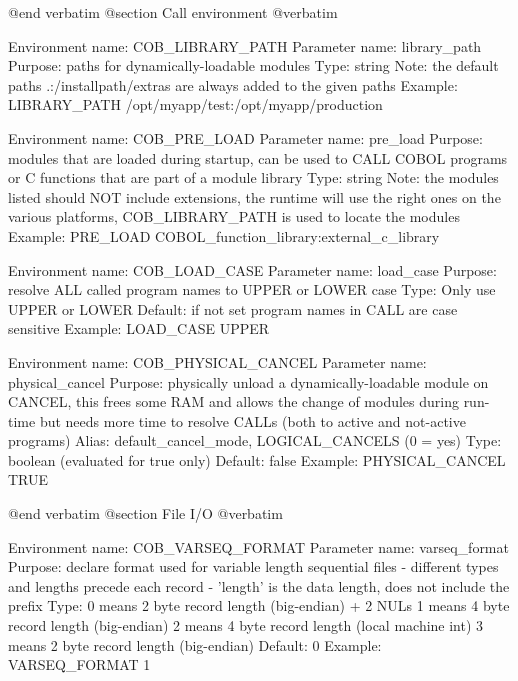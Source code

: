 @end verbatim
@section Call environment
@verbatim


Environment name:  COB_LIBRARY_PATH
  Parameter name:  library_path
         Purpose:  paths for dynamically-loadable modules
            Type:  string
            Note:  the default paths .:/installpath/extras are always
                   added to the given paths
         Example:  LIBRARY_PATH    /opt/myapp/test:/opt/myapp/production

Environment name:  COB_PRE_LOAD
  Parameter name:  pre_load
         Purpose:  modules that are loaded during startup, can be used
                   to CALL COBOL programs or C functions that are part
                   of a module library
            Type:  string
            Note:  the modules listed should NOT include extensions, the
                   runtime will use the right ones on the various platforms,
                   COB_LIBRARY_PATH is used to locate the modules
         Example:  PRE_LOAD      COBOL_function_library:external_c_library

Environment name:  COB_LOAD_CASE
  Parameter name:  load_case
         Purpose:  resolve ALL called program names to UPPER or LOWER case
            Type:  Only use  UPPER  or  LOWER
         Default:  if not set program names in CALL are case sensitive
         Example:  LOAD_CASE  UPPER

Environment name:  COB_PHYSICAL_CANCEL
  Parameter name:  physical_cancel
         Purpose:  physically unload a dynamically-loadable module on CANCEL,
                   this frees some RAM and allows the change of modules during
                   run-time but needs more time to resolve CALLs (both to
                   active and not-active programs)
           Alias:  default_cancel_mode, LOGICAL_CANCELS (0 = yes)
            Type:  boolean (evaluated for true only)
         Default:  false
         Example:  PHYSICAL_CANCEL  TRUE


@end verbatim
@section File I/O
@verbatim


Environment name:  COB_VARSEQ_FORMAT
  Parameter name:  varseq_format
         Purpose:  declare format used for variable length sequential files 
                   - different types and lengths precede each record
                   - 'length' is the data length, does not include the prefix
            Type:  0   means 2 byte record length (big-endian) + 2 NULs
                   1   means 4 byte record length (big-endian)
                   2   means 4 byte record length (local machine int)
                   3   means 2 byte record length (big-endian)
         Default:  0
         Example:  VARSEQ_FORMAT 1

